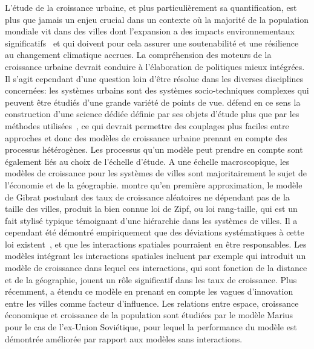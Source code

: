 {L'étude de la croissance urbaine, et plus particulièrement sa quantification, est plus que jamais un enjeu crucial dans un contexte où la majorité de la population mondiale vit dans des villes dont l'expansion a des impacts environnementaux significatifs~\cite{seto2012global} et qui doivent pour cela assurer une soutenabilité et une résilience au changement climatique accrues. La compréhension des moteurs de la croissance urbaine devrait conduire à l'élaboration de politiques mieux intégrées. Il s'agit cependant d'une question loin d'être résolue dans les diverses disciplines concernées: les systèmes urbains sont des systèmes socio-techniques complexes qui peuvent être étudiés d'une grande variété de points de vue.  défend en ce sens la construction d'une science dédiée définie par ses objets d'étude plus que par les méthodes utilisées~\cite{batty2013new}, ce qui devrait permettre des couplages plus faciles entre approches et donc des modèles de croissance urbaine prenant en compte des processus hétérogènes. Les processus qu'un modèle peut prendre en compte sont également liés au choix de l'échelle d'étude. A une échelle macroscopique, les modèles de croissance pour les systèmes de villes sont majoritairement le sujet de l'économie et de la géographie. \cite{gabaix1999zipf}  montre qu'en première approximation, le modèle de Gibrat postulant des taux de croissance aléatoires ne dépendant pas de la taille des villes, produit la bien connue loi de Zipf, ou loi rang-taille, qui est un fait stylisé typique témoignant d'une hiérarchie dans les systèmes de villes. Il a cependant été démontré empiriquement que des déviations systématiques à cette loi existent~\cite{rozenfeld2008laws}, et que les interactions spatiales pourraient en être responsables. Les modèles intégrant les interactions spatiales incluent par exemple \cite{bretagnolle2000long} qui introduit un modèle de croissance dans lequel ces interactions, qui sont fonction de la distance et de la géographie, jouent un rôle significatif dans les taux de croissance. Plus récemment, \cite{favaro2011gibrat} a étendu ce modèle en prenant en compte les vagues d'innovation entre les villes comme facteur d'influence. Les relations entre espace, croissance économique et croissance de la population sont étudiées par le modèle Marius~\cite{cottineau2014evolution} pour le cas de l'ex-Union Soviétique, pour lequel la performance du modèle est démontrée améliorée par rapport aux modèles sans interactions.
}

